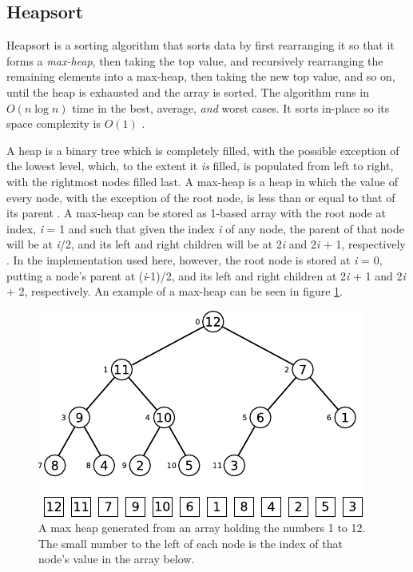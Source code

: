 \documentclass[12pt, a4paper]{article}
\begin{document}
\subsection{Heapsort}\label{sec:heapsort}

Heapsort is a sorting algorithm that sorts data by first rearranging it so that it forms a \emph{max-heap}, then taking the top value, and recursively rearranging the remaining elements into a max-heap, then taking the new top value, and so on, until the heap is exhausted and the array is sorted. The algorithm runs in $O(n\log n)$ time in the best, average, \emph{and} worst cases. It sorts in-place so its space complexity is $O(1)$ \autocite[129]{cormen01}.

A heap is a binary tree which is completely filled, with the possible exception of the lowest level, which, to the extent it  \emph{is} filled, is populated from left to right, with the rightmost nodes filled last. A max-heap is a heap in which the value of every node, with the exception of the root node, is less than or equal to that of its parent \autocite[127-129]{cormen01}. A max-heap can be stored as 1-based array with the root node at index, \emph{i} = 1 and such that given the index \emph{i} of any node, the parent of that node will be at \emph{i}/2, and its left and right children will be at 2\emph{i} and 2\emph{i} + 1, respectively \autocites[128]{cormen01}[148]{bentley:pearls}. In the implementation used here, however, the root node is stored at \emph{i} = 0, putting a node's parent at (\emph{i}-1)/2, and its left and right children at 2\emph{i} + 1 and 2\emph{i} + 2, respectively. An example of a max-heap can be seen in figure \ref{fig:heap}.


\begin{figure}
    \centering
    \includegraphics{figures/heap.pdf}
    \caption{\label{fig:heap}A max heap generated from an array holding the numbers 1 to 12. The small number to the left of each node is the index of that node's value in the array below.}
\end{figure}
\end{document}
